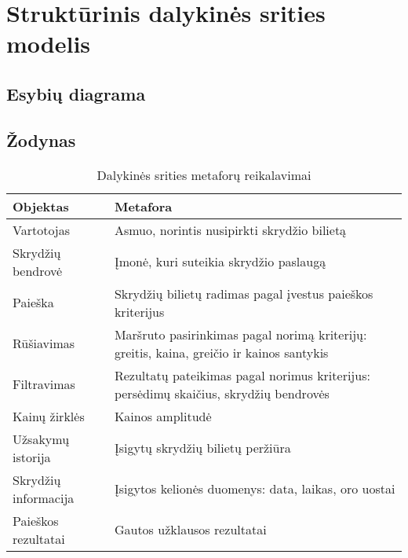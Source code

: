 \documentclass{VUMIFPSkursinis}
\begin{document}
        \section{Struktūrinis dalykinės srities modelis}
            \subsection{Esybių diagrama}
    
            \subsection{Žodynas}
    
                \begin{table}[H]\footnotesize
                \centering
                \caption{Dalykinės srities metaforų reikalavimai}
                    {\begin{tabular}{|l|l|} \hline
                        Objektas & Metafora \\
                        \hline
                        \hline
                        Vartotojas  & Asmuo, norintis nusipirkti skrydžio bilietą \\
                        \hline
                        Skrydžių bendrovė  & Įmonė, kuri suteikia skrydžio paslaugą \\
                        \hline
                        Paieška & Skrydžių bilietų radimas pagal įvestus paieškos kriterijus \\
                        \hline
                        Rūšiavimas & Maršruto pasirinkimas pagal norimą kriterijų: greitis, kaina, greičio ir kainos santykis \\
                        \hline
                        Filtravimas & Rezultatų pateikimas pagal norimus kriterijus: persėdimų skaičius, skrydžių bendrovės \\
                        \hline
                        Kainų žirklės & Kainos amplitudė \\
                        \hline
                        Užsakymų istorija & Įsigytų skrydžių bilietų peržiūra \\
                        \hline
                        Skrydžių informacija & Įsigytos kelionės duomenys: data, laikas, oro uostai \\
                        \hline
                        Paieškos rezultatai & Gautos užklausos rezultatai \\
                        \hline
                    \end{tabular}}
                \label{tab:table example}
                \end{table}
    
\end{document}
